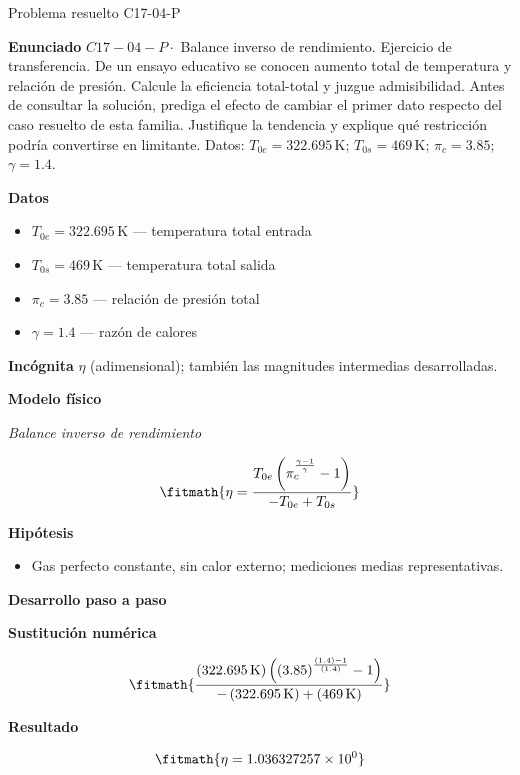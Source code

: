 \documentclass[10pt,openany]{book}
\begin{document}
\begin{studiumworked}{Problema resuelto C17-04-P}


\noindent\textbf{Enunciado}
\(C17-04-P \cdot\) Balance inverso de rendimiento. Ejercicio de transferencia. De un ensayo educativo se conocen aumento total de temperatura y relación de presión. Calcule la eficiencia total-total y juzgue admisibilidad. Antes de consultar la solución, prediga el efecto de cambiar el primer dato respecto del caso resuelto de esta familia. Justifique la tendencia y explique qué restricción podría convertirse en limitante. Datos: \(T_{0e}=322.695\, \mathrm{K}\); \(T_{0s}=469\, \mathrm{K}\); \(\pi_c=3.85\); \(\gamma=1.4\).

\noindent\textbf{Datos}
\begin{itemize}
\item $T_{0e} = 322.695\,\mathrm{K}$ — temperatura total entrada
\item $T_{0s} = 469\,\mathrm{K}$ — temperatura total salida
\item $\pi_c = 3.85$ — relación de presión total
\item $\gamma = 1.4$ — razón de calores
\end{itemize}

\noindent\textbf{Incógnita}
$\eta$ (adimensional); también las magnitudes intermedias desarrolladas.

\noindent\textbf{Modelo físico}

\noindent\textit{Balance inverso de rendimiento}

\[
\fitmath{\eta=\frac{T_{0e} \left(\pi_c^{\frac{\gamma - 1}{\gamma}} - 1\right)}{- T_{0e} + T_{0s}}}
\]

\noindent\textbf{Hipótesis}
\begin{itemize}
\item Gas perfecto constante, sin calor externo; mediciones medias representativas.
\end{itemize}

\noindent\textbf{Desarrollo paso a paso}



\noindent\textbf{Sustitución numérica}

\[
\fitmath{\frac{\left(322.695\,\mathrm{K}\right) \left(\left(3.85\right)^{\frac{\left(1.4\right) - 1}{\left(1.4\right)}} - 1\right)}{- \left(322.695\,\mathrm{K}\right) + \left(469\,\mathrm{K}\right)}}
\]

\noindent\textbf{Resultado}

\[
\fitmath{\eta=1.036327257\times10^{0}}
\]


\end{studiumworked}
\end{document}
